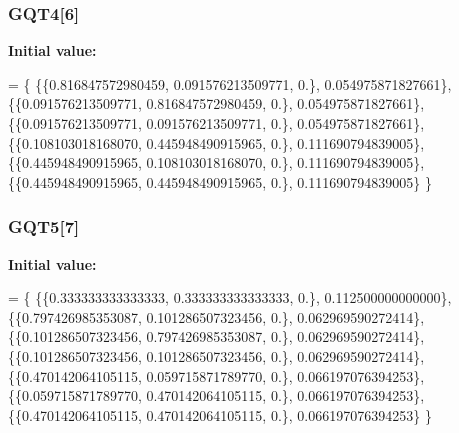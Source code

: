 \subsubsection[{G\-Q\-T4}]{ G\-Q\-T4[6]}\label{GaussQuadratureTri_8cc_aca7cc0c5b620af0477fb4813c9700f42}
{\bfseries Initial value\-:}
\begin{DoxyCode}
= \{
  \{\{0.816847572980459, 0.091576213509771, 0.\}, 0.054975871827661\},
  \{\{0.091576213509771, 0.816847572980459, 0.\}, 0.054975871827661\},
  \{\{0.091576213509771, 0.091576213509771, 0.\}, 0.054975871827661\},
  \{\{0.108103018168070, 0.445948490915965, 0.\}, 0.111690794839005\},
  \{\{0.445948490915965, 0.108103018168070, 0.\}, 0.111690794839005\},
  \{\{0.445948490915965, 0.445948490915965, 0.\}, 0.111690794839005\}
\}
\end{DoxyCode}
\subsubsection[{G\-Q\-T5}]{ G\-Q\-T5[7]}\label{GaussQuadratureTri_8cc_a45b9ca027b84f1804ce350bd720ca81a}
{\bfseries Initial value\-:}
\begin{DoxyCode}
= \{
  \{\{0.333333333333333, 0.333333333333333, 0.\}, 0.112500000000000\},
  \{\{0.797426985353087, 0.101286507323456, 0.\}, 0.062969590272414\},
  \{\{0.101286507323456, 0.797426985353087, 0.\}, 0.062969590272414\},
  \{\{0.101286507323456, 0.101286507323456, 0.\}, 0.062969590272414\},
  \{\{0.470142064105115, 0.059715871789770, 0.\}, 0.066197076394253\},
  \{\{0.059715871789770, 0.470142064105115, 0.\}, 0.066197076394253\},
  \{\{0.470142064105115, 0.470142064105115, 0.\}, 0.066197076394253\}
\}
\end{DoxyCode}
